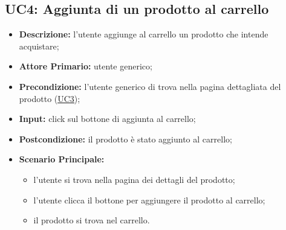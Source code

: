         \subsection{UC4: Aggiunta di un prodotto al carrello}
        \label{sec:UC4}
        \begin{itemize}
            \item \textbf{Descrizione:} l'utente aggiunge al carrello un prodotto che intende acquistare;
            \item \textbf{Attore Primario:} utente generico;
            \item \textbf{Precondizione:} l'utente generico di trova nella pagina dettagliata del prodotto (\hyperref[sec:UC3]{\underline{UC3}});
            \item \textbf{Input:} click sul bottone di aggiunta al carrello;
            \item \textbf{Postcondizione:} il prodotto è stato aggiunto al carrello;
            \item \textbf{Scenario Principale:}
            \begin{itemize}
                \item l'utente si trova nella pagina dei dettagli del prodotto;
                \item l'utente clicca il bottone per aggiungere il prodotto al carrello;
                \item il prodotto si trova nel carrello.
            \end{itemize}
        \end{itemize}
